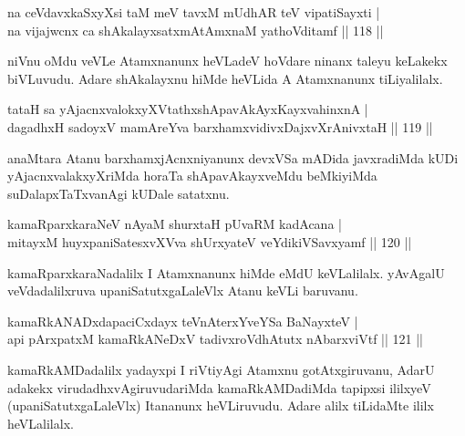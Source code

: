 \begin{shl}
na ceVdavxkaSxyXsi taM meV tavxM mUdhAR teV vipatiSayxti |\\
na vijajwcnx ca shAkalayxsatxmAtAmxnaM yathoVditamf \hfill || 118 ||
\end{shl}

\begin{artha}%
niVnu oMdu veVLe Atamxnanunx heVLadeV hoVdare ninanx taleyu keLakekx biVLuvudu. Adare shAkalayxnu hiMde heVLida A Atamxnanunx tiLiyalilalx.
\end{artha}

\begin{shl}
tataH sa yAjacnxvalokxyXVtathxshApavAkAyxKayxvahinxnA |\\
dagadhxH sadoyxV mamAreYva barxhamxvidivxDajxvXrAnivxtaH \hfill || 119 ||
\end{shl}

\begin{artha}
anaMtara Atanu barxhamxjAcnxniyanunx devxVSa mADida javxradiMda kUDi yAjacnxvalakxyXriMda horaTa shApavAkayxveMdu beMkiyiMda suDalapxTaTxvanAgi kUDale satatxnu.
\end{artha}


\begin{shl}
kamaRparxkaraNeV nAyaM shurxtaH pUvaRM kadAcana |\\
mitayxM huyxpaniSatesxvXVva shUrxyateV veYdikiVSavxyamf \hfill || 120 ||
\end{shl}

\begin{artha}
kamaRparxkaraNadalilx I Atamxnanunx hiMde eMdU keVLalilalx. yAvAgalU veVdadalilxruva upaniSatutxgaLaleVlx Atanu keVLi baruvanu.
\end{artha}


\begin{shl}
kamaRkANADxdapaciCxdayx teVnAterxYveYSa BaNayxteV |\\
api pArxpatxM kamaRkANeDxV tadivxroVdhAtutx nAbarxviVtf \hfill || 121 ||
\end{shl}

\begin{artha}
kamaRkAMDadalilx yadayxpi I riVtiyAgi Atamxnu gotAtxgiruvanu, AdarU adakekx virudadhxvAgiruvudariMda kamaRkAMDadiMda tapipxsi ililxyeV (upaniSatutxgaLaleVlx) Itananunx heVLiruvudu. Adare alilx tiLidaMte ililx heVLalilalx.
\end{artha}

